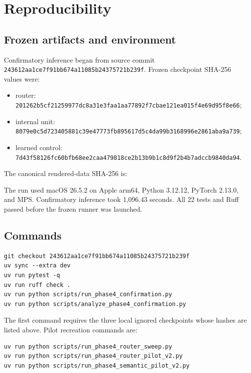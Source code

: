 \documentclass[11pt]{article}
\newcommand{\code}[1]{\texttt{#1}}
\begin{document}
\section{Reproducibility}

\subsection{Frozen artifacts and environment}

Confirmatory inference began from source commit
\code{243612aa1ce7f91bb674a11085b24375721b239f}. Frozen checkpoint SHA-256
values were:

\begin{itemize}
  \item router:
  \code{201262b5cf21259977dc8a31e3faa1aa77892f7cbae121ea015f4e69d95f8e66};
  \item internal unit:
  \code{8079e0c5d723405881c39e47773fb895617d5c4da99b3168996e2861aba9a739};
  \item learned control:
  \code{7d43f58126fc60bfb68ee2caa479818ce2b13b9b1c8d9f2b4b7adccb9840da94}.
\end{itemize}

The canonical rendered-data SHA-256 is:
\begin{center}
\small
{}
\end{center}
The run used macOS 26.5.2 on Apple arm64, Python 3.12.12, PyTorch 2.13.0,
and MPS. Confirmatory inference took 1,096.43 seconds. All 22 tests and Ruff
passed before the frozen runner was launched.

\subsection{Commands}

\begin{verbatim}
git checkout 243612aa1ce7f91bb674a11085b24375721b239f
uv sync --extra dev
uv run pytest -q
uv run ruff check .
uv run python scripts/run_phase4_confirmation.py
uv run python scripts/analyze_phase4_confirmation.py
\end{verbatim}

The first command requires the three local ignored checkpoints whose hashes
are listed above. Pilot recreation commands are:

\begin{verbatim}
uv run python scripts/run_phase4_router_sweep.py
uv run python scripts/run_phase4_router_pilot_v2.py
uv run python scripts/run_phase4_semantic_pilot_v2.py
\end{verbatim}
\end{document}

